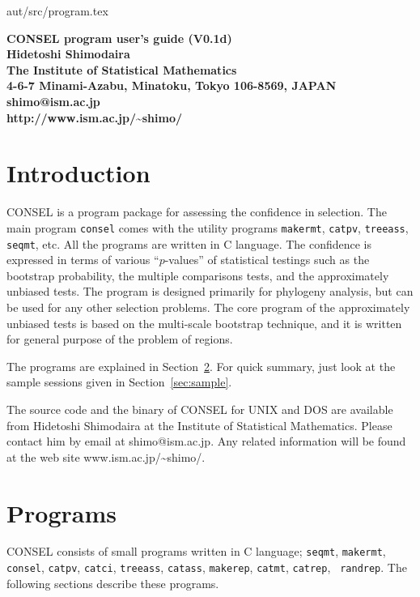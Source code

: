 \documentclass[12pt]{article}
\newcommand{\refsec}[1]{Section~\ref{sec:#1}}
\begin{document}
{aut/src/program.tex\hfill \documentid}
\begin{center}
 \bf\large CONSEL program user's guide (V0.1d)\\[3ex]
 Hidetoshi Shimodaira\\[2ex]
 \normalsize
 The Institute of Statistical Mathematics\\
 4-6-7 Minami-Azabu, Minatoku, Tokyo 106-8569, JAPAN\\
 shimo@ism.ac.jp\\
 http://www.ism.ac.jp/\~{}shimo/
\end{center}

\section{Introduction}

CONSEL is a program package for assessing the confidence in
selection. The main program {\tt consel} comes with the utility programs
{\tt makermt}, {\tt catpv}, {\tt treeass}, {\tt seqmt}, etc. All the
programs are written in C language. The confidence is expressed in terms
of various ``$p$-values'' of statistical testings such as the bootstrap
probability, the multiple comparisons tests, and the approximately
unbiased tests. The program is designed primarily for phylogeny
analysis, but can be used for any other selection problems. The core
program of the approximately unbiased tests is based on the multi-scale
bootstrap technique, and it is written for general purpose of the
problem of regions.

The programs are explained in \refsec{usage}.  For quick summary, just
look at the sample sessions given in \refsec{sample}.

The source code and the binary of CONSEL for UNIX and DOS are available
from Hidetoshi Shimodaira at the Institute of Statistical
Mathematics. Please contact him by email at shimo@ism.ac.jp. Any related
information will be found at the web site www.ism.ac.jp/\~{}shimo/.



\section{Programs} \label{sec:usage}

CONSEL consists of small programs written in C language; {\tt seqmt},
{\tt makermt}, {\tt consel}, {\tt catpv}, {\tt catci}, {\tt treeass},
{\tt catass}, {\tt makerep}, {\tt catmt}, {\tt catrep}, {\tt
randrep}. The following sections describe these programs.
\end{document}
